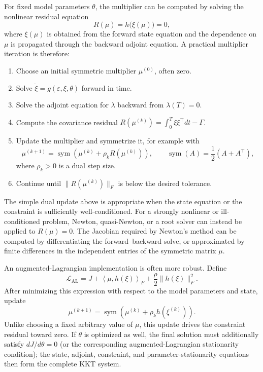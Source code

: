 \documentclass[11pt]{article}
\begin{document}
For fixed model parameters $\theta$, the multiplier can be computed by
solving the nonlinear residual equation
\begin{equation}
    R(\mu)=h\bigl(\xi(\mu)\bigr)=0,
\end{equation}
where $\xi(\mu)$ is obtained from the forward state equation and the
dependence on $\mu$ is propagated through the backward adjoint equation. A
practical multiplier iteration is therefore:
\begin{enumerate}
    \item Choose an initial symmetric multiplier $\mu^{(0)}$, often zero.
    \item Solve $\dot{\xi}=g(\varepsilon,\xi,\theta)$ forward in time.
    \item Solve the adjoint equation for $\lambda$ backward from
          $\lambda(T)=0$.
    \item Compute the covariance residual
          $R(\mu^{(k)})=\int_0^T\xi\xi^\top dt-\Gamma$.
    \item Update the multiplier and symmetrize it, for example with
          \begin{equation}
              \mu^{(k+1)}
              =\operatorname{sym}\left(
              \mu^{(k)}+\rho_k R(\mu^{(k)})\right),
              \qquad
              \operatorname{sym}(A)=\frac{1}{2}(A+A^\top),
          \end{equation}
          where $\rho_k>0$ is a dual step size.
    \item Continue until $\|R(\mu^{(k)})\|_F$ is below the desired tolerance.
\end{enumerate}
The simple dual update above is appropriate when the state equation or the
constraint is sufficiently well-conditioned. For a strongly nonlinear or
ill-conditioned problem, Newton, quasi-Newton, or a root solver can instead be
applied to $R(\mu)=0$. The Jacobian required by Newton's method can be
computed by differentiating the forward--backward solve, or approximated by
finite differences in the independent entries of the symmetric matrix $\mu$.

An augmented-Lagrangian implementation is often more robust. Define
\begin{equation}
    \mathcal{L}_{\mathrm{AL}}
    =J+\left\langle\mu,h(\xi)\right\rangle_F
    +\frac{\rho}{2}\|h(\xi)\|_F^2.
\end{equation}
After minimizing this expression with respect to the model parameters and
state, update
\begin{equation}
    \mu^{(k+1)}
    =\operatorname{sym}\left(\mu^{(k)}+\rho_k h(\xi^{(k)})\right).
\end{equation}
Unlike choosing a fixed arbitrary value of $\mu$, this update drives the
constraint residual toward zero. If $\theta$ is optimized as well, the final
solution must additionally satisfy $dJ/d\theta=0$ (or the corresponding
augmented-Lagrangian stationarity condition); the state, adjoint, constraint,
and parameter-stationarity equations then form the complete KKT system.
\end{document}
